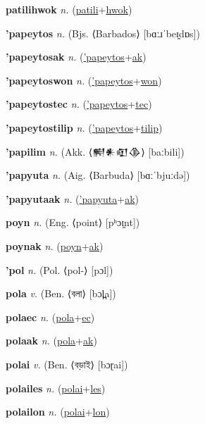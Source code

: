 \textbf{\hypertarget{patilihwok}{patilihwok}} \textit{n.} (\hyperlink{patili}{patili}+\allowbreak \hyperlink{hwok}{hwok})


\textbf{\hypertarget{'papeytos}{'papeytos}} \textit{n.} (Bjs. ⟨Barbados⟩ [bɑːɹˈbeɪ̯dɒs])


\textbf{\hypertarget{'papeytosak}{'papeytosak}} \textit{n.} (\hyperlink{'papeytos}{'papeytos}+\allowbreak \hyperlink{ak}{ak})


\textbf{\hypertarget{'papeytoswon}{'papeytoswon}} \textit{n.} (\hyperlink{'papeytos}{'papeytos}+\allowbreak \hyperlink{won}{won})


\textbf{\hypertarget{'papeytostec}{'papeytostec}} \textit{n.} (\hyperlink{'papeytos}{'papeytos}+\allowbreak \hyperlink{tec}{tec})


\textbf{\hypertarget{'papeytostilip}{'papeytostilip}} \textit{n.} (\hyperlink{'papeytos}{'papeytos}+\allowbreak \hyperlink{tilip}{tilip})


\textbf{\hypertarget{'papilim}{'papilim}} \textit{n.} (Akk. ⟨{\cuneiform{}𒆍𒀭𒊏𒆠}⟩ [baːbili])


\textbf{\hypertarget{'papyuta}{'papyuta}} \textit{n.} (Aig. ⟨Barbuda⟩ [bɑːˈbjuːdə])


\textbf{\hypertarget{'papyutaak}{'papyutaak}} \textit{n.} (\hyperlink{'papyuta}{'papyuta}+\allowbreak \hyperlink{ak}{ak})


\textbf{\hypertarget{poyn}{poyn}} \textit{n.} (Eng. ⟨point⟩ [pʰɔɪ̯nt])


\textbf{\hypertarget{poynak}{poynak}} \textit{n.} (\hyperlink{poyn}{poyn}+\allowbreak \hyperlink{ak}{ak})


\textbf{\hypertarget{'pol}{'pol}} \textit{n.} (Pol. ⟨pol-⟩ [pɔl])


\textbf{\hypertarget{pola}{pola}} \textit{v.} (Ben. ⟨{\bengali{}বলা}⟩ [bɔl̪a])


\textbf{\hypertarget{polaec}{polaec}} \textit{n.} (\hyperlink{pola}{pola}+\allowbreak \hyperlink{ec}{ec})


\textbf{\hypertarget{polaak}{polaak}} \textit{n.} (\hyperlink{pola}{pola}+\allowbreak \hyperlink{ak}{ak})


\textbf{\hypertarget{polai}{polai}} \textit{v.} (Ben. ⟨{\bengali{}বড়াই}⟩ [bɔɽai])


\textbf{\hypertarget{polailes}{polailes}} \textit{n.} (\hyperlink{polai}{polai}+\allowbreak \hyperlink{les}{les})


\textbf{\hypertarget{polailon}{polailon}} \textit{n.} (\hyperlink{polai}{polai}+\allowbreak \hyperlink{lon}{lon})


